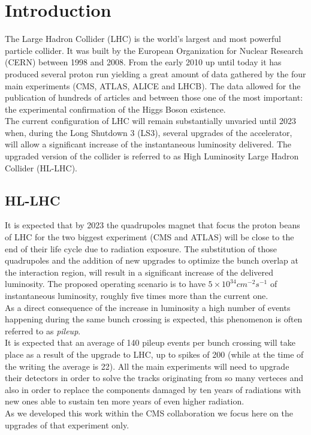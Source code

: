 \chapter{Introduction}\label{ch:intro}
The Large Hadron Collider (LHC) is the world's largest and most powerful particle collider. It was built by the European Organization for Nuclear Research (CERN) between 1998 and 2008. From the early 2010 up until today it has produced several proton run yielding a great amount of data gathered by the four main experiments (CMS, ATLAS, ALICE and LHCB). The data allowed for the publication of hundreds of articles and between those one of the most important: the experimental confirmation of the Higgs Boson existence.\\ The current configuration of LHC will remain substantially unvaried until 2023 when, during the Long Shutdown 3 (LS3), several upgrades of the accelerator, will allow a significant increase of the instantaneous luminosity delivered. The upgraded version of the collider is referred to as High Luminosity Large Hadron Collider (HL-LHC).

\section{HL-LHC}
It is expected that by 2023 the quadrupoles magnet that focus the proton beans of LHC for the two biggest experiment (CMS and ATLAS) will be close to the end of their life cycle due to radiation exposure. The substitution of those quadrupoles and the addition of new upgrades to optimize the bunch overlap at the interaction region, will result in a significant increase of the delivered luminosity.
The proposed operating scenario is to have $5 \times 10^{34} \unit{cm^{-2}s^{-1}}$ of instantaneous luminosity, roughly five times more than the current one.\\
As a direct consequence of the increase in luminosity a high number of events happening during the same bunch crossing is expected, this phenomenon is often referred to as \textit{pileup}.\\
It is expected that an average of 140 pileup events \cite{tdr} per bunch crossing will take place as a result of the upgrade to LHC, up to spikes of 200 (while at the time of the writing the average is 22). All the main experiments will need to upgrade their detectors in order to solve the tracks originating from so many verteces and also in order to replace the components damaged by ten years of radiations with new ones able to sustain ten more years of even higher radiation.\\
As we developed this work within the CMS collaboration we focus here on the upgrades of that experiment only.

